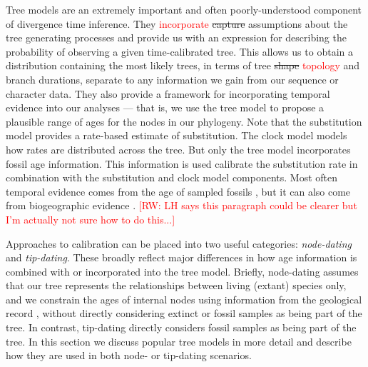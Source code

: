 \documentclass[11pt]{article}
\newcommand{\rw}[1]{{\textcolor{red}{[RW: #1]}}} %
\newcommand{\edit}[1]{{\textcolor{red}{#1}}} %
\begin{document}
Tree models are an extremely important and often poorly-understood component of divergence time inference. 
They \edit{incorporate} \sout{capture} assumptions about the tree generating processes and provide us with an expression for describing the probability of observing a given time-calibrated tree. This allows us to obtain a distribution containing the most likely trees, in terms of tree \sout{shape} \edit{topology} and branch durations, separate to any information we gain from our sequence or character data.
They also provide a framework for incorporating temporal evidence into our analyses --- that is, we use the tree model to propose a plausible range of ages for the nodes in our phylogeny.
Note that the substitution model provides a rate-based estimate of substitution. The clock model models how rates are distributed across the tree. But only the tree model incorporates fossil age information.
This information is used calibrate the substitution rate in combination with the substitution and clock model components. %
Most often temporal evidence comes from the age of sampled fossils \cite{Parham2012,Heath2014}, but it can also come from biogeographic evidence \cite{deBaets2016,Landis2016}. \rw{LH says this paragraph could be clearer but I'm actually not sure how to do this...}

Approaches to calibration can be placed into two useful categories: \textit{node-dating} and \textit{tip-dating}. 
These broadly reflect major differences in how age information is combined with or incorporated into the tree model.
Briefly, node-dating assumes that our tree represents the relationships between living (extant) species only, and we constrain the ages of internal nodes using information from the geological record%
, without directly considering extinct or fossil samples as being part of the tree.
In contrast, tip-dating directly considers fossil samples as being part of the tree.
In this section we discuss popular tree models in more detail and describe how they are used in both node- or tip-dating scenarios.
\end{document}
